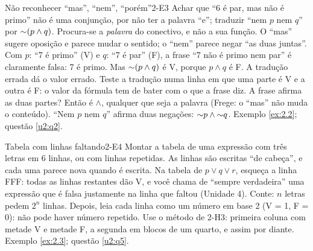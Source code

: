 \begin{erro}{Não reconhecer \enquote{mas}, \enquote{nem}, \enquote{porém}}{2-E3}
 Achar que \enquote{6 é par, mas não é primo} não é uma conjunção, por não ter a palavra \enquote{e}; traduzir \enquote{nem $p$ nem $q$} por ${{\sim}}(p\wedge q)$.
 Procura-se a \emph{palavra} do conectivo, e não a sua função. O \enquote{mas} sugere oposição e parece mudar o sentido; o \enquote{nem} parece negar \enquote{as duas juntas}.
 Com $p$: \enquote{7 é primo} (V) e $q$: \enquote{7 é par} (F), a frase \enquote{7 não é primo nem par} é claramente falsa: 7 é primo. Mas ${{\sim}}(p\wedge q)$ é V, porque $p\wedge q$ é F. A tradução errada dá o valor errado.
 Teste a tradução numa linha em que uma parte é V e a outra é F: o valor da fórmula tem de bater com o que a frase diz.
 A frase afirma as duas partes? Então é $\wedge$, qualquer que seja a palavra (Frege: o \enquote{mas} não muda o conteúdo). \enquote{Nem $p$ nem $q$} afirma duas negações: ${{\sim}}p\wedge{{\sim}}q$.
 Exemplo \ref{ex:2.2}; questão \ref{u2:q2}.
\end{erro}

\begin{erro}{Tabela com linhas faltando}{2-E4}
 Montar a tabela de uma expressão com três letras em 6 linhas, ou com linhas repetidas.
 As linhas são escritas \enquote{de cabeça}, e cada uma parece nova quando é escrita.
 Na tabela de $p\vee q\vee r$, esqueça a linha FFF: todas as linhas restantes dão V, e você chama de \enquote{sempre verdadeira} uma expressão que é falsa justamente na linha que faltou (Unidade 4).
 Conte: $n$ letras pedem $2^n$ linhas. Depois, leia cada linha como um número em base 2 (V = 1, F = 0): não pode haver número repetido.
 Use o método de 2-H3: primeira coluna com metade V e metade F, a segunda em blocos de um quarto, e assim por diante.
 Exemplo \ref{ex:2.3}; questão \ref{u2:q5}.
\end{erro}

\Observacoes


